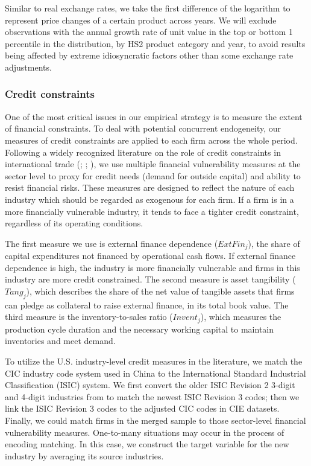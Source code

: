 \documentclass[12pt]{article}
\begin{document}
Similar to real exchange rates, we take the first difference of the logarithm to represent price changes of a certain product across years. We will exclude observations with the annual growth rate of unit value in the top or bottom 1 percentile in the distribution, by HS2 product category and year, to avoid results being affected by extreme idiosyncratic factors other than some exchange rate adjustments.

\subsubsection{Credit constraints}

One of the most critical issues in our empirical strategy is to measure the extent of financial constraints. To deal with potential concurrent endogeneity, our measures of credit constraints are applied to each firm across the whole period. Following a widely recognized literature on the role of credit constraints in international trade (\cite{kroszner2007}; \cite{manova-wei-zhang2015}; \cite{fan-lai-li2015}), we use multiple financial vulnerability measures at the sector level to proxy for credit needs (demand for outside capital) and ability to resist financial risks. These measures are designed to reflect the nature of each industry which should be regarded as exogenous for each firm. If a firm is in a more financially vulnerable industry, it tends to face a tighter credit constraint, regardless of its operating conditions.

The first measure we use is external finance dependence ($ExtFin_j$), the share of capital expenditures not financed by operational cash flows. If external finance dependence is high, the industry is more financially vulnerable and firms in this industry are more credit constrained. The second measure is asset tangibility ($Tang_j$), which describes the share of the net value of tangible assets that firms can pledge as collateral to raise external finance, in its total book value. The third measure is the inventory-to-sales ratio ($Invent_j$), which measures the production cycle duration and the necessary working capital to maintain inventories and meet demand.  

To utilize the U.S. industry-level credit measures in the literature, we match the CIC industry code system used in China to the International Standard Industrial Classification (ISIC) system. We first convert the older ISIC Revision 2 3-digit and 4-digit industries from \cite{manova-wei-zhang2015} to match the newest ISIC Revision 3 codes; then we link the ISIC Revision 3 codes to the adjusted CIC codes in CIE datasets. Finally, we could match firms in the merged sample to those sector-level financial vulnerability measures. One-to-many situations may occur in the process of encoding matching. In this case, we construct the target variable for the new industry by averaging its source industries.
\end{document}
